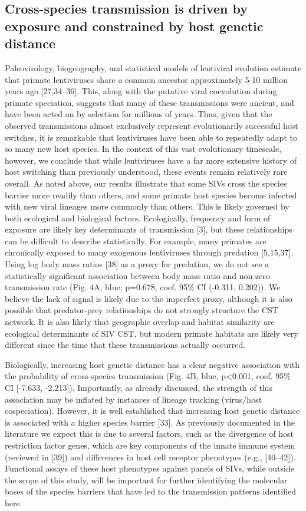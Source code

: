 \subsection*{Cross-species transmission is driven by exposure and constrained by host genetic distance}
Paleovirology, biogeography, and statistical models of lentiviral evolution estimate that primate lentiviruses share a common ancestor approximately 5-10 million years ago [27,34–36].
This, along with the putative viral coevolution during primate speciation, suggests that many of these transmissions were ancient, and have been acted on by selection for millions of years.
Thus, given that the observed transmissions almost exclusively represent evolutionarily successful host switches, it is remarkable that lentiviruses have been able to repeatedly adapt to so many new host species.
In the context of this vast evolutionary timescale, however, we conclude that while lentiviruses have a far more extensive history of host switching than previously understood, these events remain relatively rare overall.
As noted above, our results illustrate that some SIVs cross the species barrier more readily than others, and some primate host species become infected with new viral lineages more commonly than others.
This is likely governed by both ecological and biological factors.
Ecologically, frequency and form of exposure are likely key determinants of transmission [3], but these relationships can be difficult to describe statistically.
For example, many primates are chronically exposed to many exogenous lentiviruses through predation [5,15,37].
Using log body mass ratios [38] as a proxy for predation, we do not see a statistically significant association between body mass ratio and non-zero transmission rate (Fig. 4A, blue; p=0.678, coef. 95\% CI (-0.311, 0.202)).
We believe the lack of signal is likely due to the imperfect proxy, although it is also possible that predator-prey relationships do not strongly structure the CST network.
It is also likely that geographic overlap and habitat similarity are ecological determinants of SIV CST, but modern primate habitats are likely very different since the time that these transmissions actually occurred.

Biologically, increasing host genetic distance has a clear negative association with the probability of cross-species transmission (Fig. 4B, blue, p<0.001, coef. 95\% CI [-7.633, -2.213]).
Importantly, as already discussed, the strength of this association may be inflated by instances of lineage tracking (virus/host cospeciation).
However, it is well established that increasing host genetic distance is associated with a higher species barrier [33].
As previously documented in the literature we expect this is due to several factors, such as the divergence of host restriction factor genes, which are key components of the innate immune system (reviewed in [39]) and differences in host cell receptor phenotypes (e.g., [40–42]).
Functional assays of these host phenotypes against panels of SIVs, while outside the scope of this study, will be important for further identifying the molecular bases of the species barriers that have led to the transmission patterns identified here.

